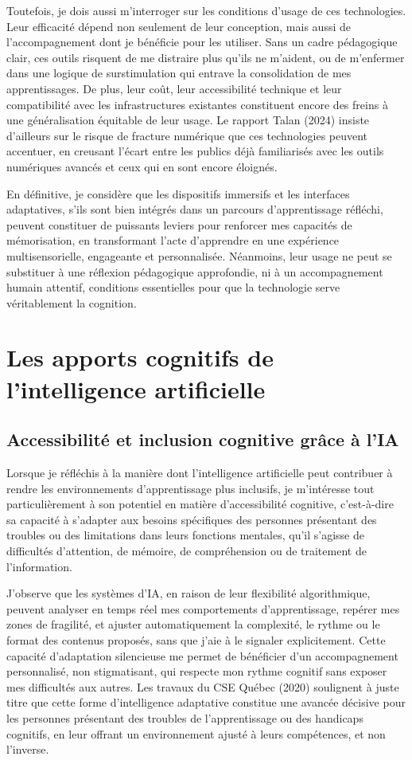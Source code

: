 \documentclass[11pt,a4paper]{report}
\begin{document}
Toutefois, je dois aussi m’interroger sur les conditions d’usage de ces technologies. Leur efficacité dépend non seulement de leur conception, mais aussi de l’accompagnement dont je bénéficie pour les utiliser. Sans un cadre pédagogique clair, ces outils risquent de me distraire plus qu’ils ne m’aident, ou de m’enfermer dans une logique de surstimulation qui entrave la consolidation de mes apprentissages. De plus, leur coût, leur accessibilité technique et leur compatibilité avec les infrastructures existantes constituent encore des freins à une généralisation équitable de leur usage. Le rapport Talan (2024) insiste d’ailleurs sur le risque de fracture numérique que ces technologies peuvent accentuer, en creusant l’écart entre les publics déjà familiarisés avec les outils numériques avancés et ceux qui en sont encore éloignés.

En définitive, je considère que les dispositifs immersifs et les interfaces adaptatives, s’ils sont bien intégrés dans un parcours d’apprentissage réfléchi, peuvent constituer de puissants leviers pour renforcer mes capacités de mémorisation, en transformant l’acte d’apprendre en une expérience multisensorielle, engageante et personnalisée. Néanmoins, leur usage ne peut se substituer à une réflexion pédagogique approfondie, ni à un accompagnement humain attentif, conditions essentielles pour que la technologie serve véritablement la cognition.

\section{Les apports cognitifs de l’intelligence artificielle}

\subsection{Accessibilité et inclusion cognitive grâce à l’IA}

Lorsque je réfléchis à la manière dont l’intelligence artificielle peut contribuer à rendre les environnements d’apprentissage plus inclusifs, je m’intéresse tout particulièrement à son potentiel en matière d’accessibilité cognitive, c’est-à-dire sa capacité à s’adapter aux besoins spécifiques des personnes présentant des troubles ou des limitations dans leurs fonctions mentales, qu’il s’agisse de difficultés d’attention, de mémoire, de compréhension ou de traitement de l’information.

J’observe que les systèmes d’IA, en raison de leur flexibilité algorithmique, peuvent analyser en temps réel mes comportements d’apprentissage, repérer mes zones de fragilité, et ajuster automatiquement la complexité, le rythme ou le format des contenus proposés, sans que j’aie à le signaler explicitement. Cette capacité d’adaptation silencieuse me permet de bénéficier d’un accompagnement personnalisé, non stigmatisant, qui respecte mon rythme cognitif sans exposer mes difficultés aux autres. Les travaux du CSE Québec (2020) soulignent à juste titre que cette forme d’intelligence adaptative constitue une avancée décisive pour les personnes présentant des troubles de l’apprentissage ou des handicaps cognitifs, en leur offrant un environnement ajusté à leurs compétences, et non l’inverse.
\end{document}
